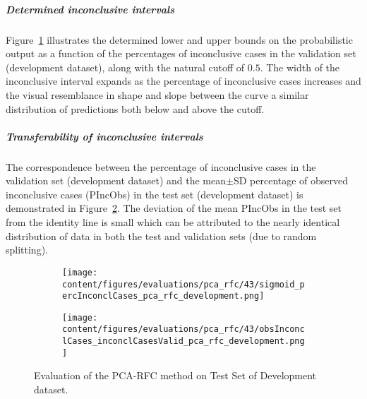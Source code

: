 \subparagraph{Determined inconclusive intervals}

Figure~\ref{fig:pca_rfc_percInconclCases_development} illustrates the determined lower and upper bounds on the 
probabilistic output as a function of the percentages of inconclusive cases in the validation set (development dataset), 
along with the natural cutoff of $0.5$.
The width of the inconclusive interval expands as the percentage of inconclusive cases increases 
and the visual resemblance in shape and slope between the curve a similar distribution of predictions both below and above the cutoff.

\subparagraph{Transferability of inconclusive intervals}

The correspondence between the percentage of inconclusive cases in the validation set (development dataset) and 
the mean$\pm$SD percentage of observed inconclusive cases (PIncObs) in the test set (development dataset) 
is demonstrated in Figure~\ref{fig:obsInconclCases_inconclCasesValid_pca_rfc_development}.
The deviation of the mean PIncObs in the test set from the 
identity line is small which can be attributed to the nearly identical distribution of data in both the test and validation sets 
(due to random splitting).


\begin{figure}[ht]
  \begin{subfigure}{0.48\textwidth}
    \centering
    \texttt{[image: content/figures/evaluations/pca\_rfc/43/sigmoid\_percInconclCases\_pca\_rfc\_development.png]}
    \label{fig:pca_rfc_percInconclCases_development}
  \end{subfigure}
  \hfill
  \begin{subfigure}{0.495\textwidth}
    \centering
    \texttt{[image: content/figures/evaluations/pca\_rfc/43/obsInconclCases\_inconclCasesValid\_pca\_rfc\_development.png]}
    \label{fig:obsInconclCases_inconclCasesValid_pca_rfc_development}
  \end{subfigure}

  \caption{Evaluation of the PCA-RFC method on Test Set of Development dataset.}
  \label{fig:pca_rfc_dev_fig}
\end{figure}


